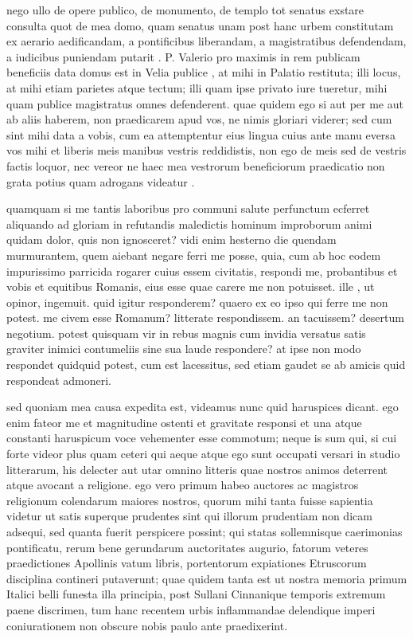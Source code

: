  nego ullo de opere publico, de monumento, de templo tot senatus exstare consulta quot de mea domo, quam senatus unam post hanc urbem constitutam ex aerario aedificandam, a pontificibus liberandam, a magistratibus defendendam, a iudicibus puniendam putarit . P. Valerio pro maximis in rem publicam beneficiis data domus est in Velia publice , at mihi in Palatio restituta; illi locus, at mihi etiam parietes atque tectum; illi quam ipse privato iure tueretur, mihi quam publice magistratus omnes defenderent. quae quidem ego si aut per me aut ab aliis haberem, non praedicarem apud vos, ne nimis gloriari viderer; sed cum sint mihi data a vobis, cum ea attemptentur eius lingua cuius ante manu eversa vos mihi et liberis meis manibus vestris reddidistis, non ego de meis sed de vestris factis loquor, nec vereor ne haec mea vestrorum beneficiorum praedicatio non grata potius quam adrogans videatur .

 quamquam si me tantis laboribus pro communi salute perfunctum ecferret aliquando ad gloriam in refutandis maledictis hominum improborum animi quidam dolor, quis non ignosceret? vidi enim hesterno die quendam murmurantem, quem aiebant negare ferri me posse, quia, cum ab hoc eodem impurissimo parricida rogarer cuius essem civitatis, respondi me, probantibus et vobis et equitibus Romanis, eius esse quae carere me non potuisset. ille , ut opinor, ingemuit. quid igitur responderem? quaero ex eo ipso qui ferre me non potest. me civem esse Romanum? litterate respondissem. an tacuissem? desertum negotium. potest quisquam vir in rebus magnis cum invidia versatus satis graviter inimici contumeliis sine sua laude respondere? at ipse non modo respondet quidquid potest, cum est lacessitus, sed etiam gaudet se ab amicis quid respondeat admoneri.

 sed quoniam mea causa expedita est, videamus nunc quid haruspices dicant. ego enim fateor me et magnitudine ostenti et gravitate responsi et una atque constanti haruspicum voce vehementer esse commotum; neque is sum qui, si cui forte videor plus quam ceteri qui aeque atque ego sunt occupati versari in studio litterarum, his delecter aut utar omnino litteris quae nostros animos deterrent atque avocant a religione. ego vero primum habeo auctores ac magistros religionum colendarum maiores nostros, quorum mihi tanta fuisse sapientia videtur ut satis superque prudentes sint qui illorum prudentiam non dicam adsequi, sed quanta fuerit perspicere possint; qui statas sollemnisque caerimonias pontificatu, rerum bene gerundarum auctoritates augurio, fatorum veteres praedictiones Apollinis vatum libris, portentorum expiationes Etruscorum disciplina contineri putaverunt; quae quidem tanta est ut nostra memoria primum Italici belli funesta illa principia, post Sullani Cinnanique temporis extremum paene discrimen, tum hanc recentem urbis inflammandae delendique imperi coniurationem non obscure nobis paulo ante praedixerint.

